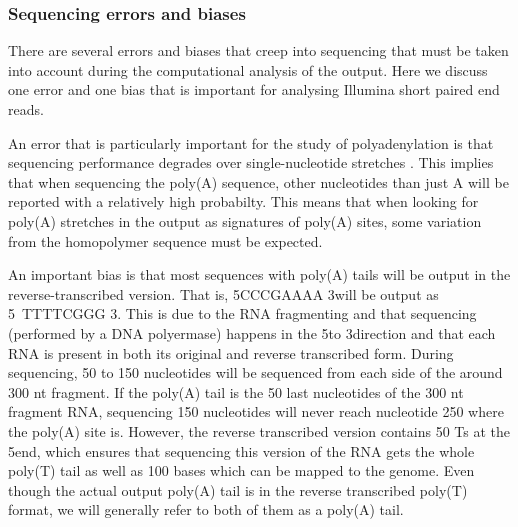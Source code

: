 \subsubsection{Sequencing errors and biases}
There are several errors and biases that creep into sequencing that must be
taken into account during the computational analysis of the output. Here we
discuss one error and one bias that is important for analysing Illumina short
paired end reads.

An error that is particularly important for the study of polyadenylation is
that sequencing performance degrades over single-nucleotide stretches
\cite{minoche_evaluation_2011}. This implies that when sequencing the poly(A)
sequence, other nucleotides than just A will be reported with a relatively high
probabilty. This means that when looking for poly(A) stretches in the output as
signatures of poly(A) sites, some variation from the homopolymer sequence must
be expected.

An important bias is that most sequences with poly(A) tails will be output in
the reverse-transcribed version. That is, 5\p CCCGAAAA 3\p will be output as 5\
TTTTCGGG 3\p. This is due to the RNA fragmenting and that sequencing
(performed by a DNA polyermase) happens in the 5\p to 3\p direction and that
each RNA is present in both its original and reverse transcribed form. During
sequencing, 50 to 150 nucleotides will be sequenced from each side of the around
300 nt fragment. If the poly(A) tail is the 50 last nucleotides of the 300 nt
fragment RNA, sequencing 150 nucleotides will never reach nucleotide 250 where
the poly(A) site is. However, the reverse transcribed version contains 50 Ts at
the 5\p end, which ensures that sequencing this version of the RNA gets the
whole poly(T) tail as well as 100 bases which can be mapped to the genome.
Even though the actual output poly(A) tail is in the reverse transcribed
poly(T) format, we will generally refer to both of them as a poly(A) tail.
